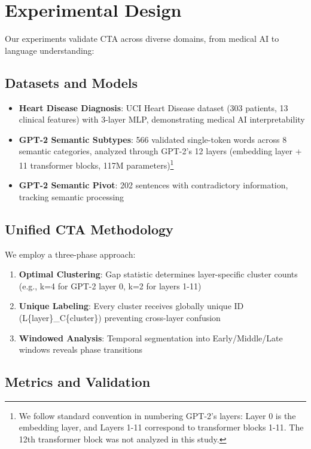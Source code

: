 \section{Experimental Design}

Our experiments validate CTA across diverse domains, from medical AI to language understanding:

\subsection{Datasets and Models}

\begin{itemize}
    \item \textbf{Heart Disease Diagnosis}: UCI Heart Disease dataset (303 patients, 13 clinical features) with 3-layer MLP, demonstrating medical AI interpretability
    \item \textbf{GPT-2 Semantic Subtypes}: 566 validated single-token words across 8 semantic categories, analyzed through GPT-2's 12 layers (embedding layer + 11 transformer blocks, 117M parameters)\footnote{We follow standard convention in numbering GPT-2's layers: Layer 0 is the embedding layer, and Layers 1-11 correspond to transformer blocks 1-11. The 12th transformer block was not analyzed in this study.}
    \item \textbf{GPT-2 Semantic Pivot}: 202 sentences with contradictory information, tracking semantic processing
\end{itemize}

\subsection{Unified CTA Methodology}

We employ a three-phase approach:

\begin{enumerate}
    \item \textbf{Optimal Clustering}: Gap statistic determines layer-specific cluster counts (e.g., k=4 for GPT-2 layer 0, k=2 for layers 1-11)
    \item \textbf{Unique Labeling}: Every cluster receives globally unique ID (L\{layer\}\_C\{cluster\}) preventing cross-layer confusion
    \item \textbf{Windowed Analysis}: Temporal segmentation into Early/Middle/Late windows reveals phase transitions
\end{enumerate}

\subsection{Metrics and Validation}

